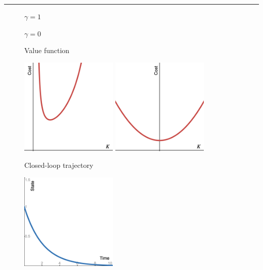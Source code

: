 \documentclass[
  letterpaper,
  DIV=11,
  numbers=noendperiod,
  oneside]{scrartcl}
\begin{document}
\begin{center}\rule{0.5\linewidth}{0.5pt}\end{center}

\begin{figure}

\begin{minipage}{0.33\linewidth}

\end{minipage}%
%
\begin{minipage}{0.33\linewidth}
\(\gamma = 1\)\end{minipage}%
%
\begin{minipage}{0.33\linewidth}
\(\gamma = 0\)\end{minipage}%
\newline
\begin{minipage}{0.33\linewidth}
Value function\end{minipage}%
%
\begin{minipage}{0.33\linewidth}
\includegraphics[width=\textwidth,height=1.82292in]{figs/desmos-controller.png}\end{minipage}%
%
\begin{minipage}{0.33\linewidth}
\includegraphics[width=\textwidth,height=1.82292in]{figs/desmos-gamma0-controller.png}\end{minipage}%
\newline
\begin{minipage}{0.33\linewidth}
Closed-loop trajectory\end{minipage}%
%
\begin{minipage}{0.33\linewidth}
\includegraphics[width=\textwidth,height=1.82292in]{figs/desmos-stable.png}\end{minipage}%

\end{figure}
\end{document}
